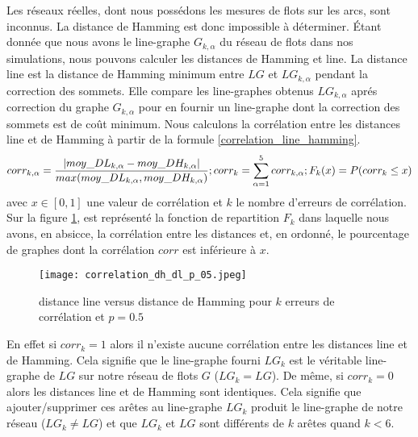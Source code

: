 Les r\'eseaux r\'eelles, dont nous poss\'edons les mesures de flots sur les arcs, sont inconnus.
La distance de Hamming est donc impossible \`a d\'eterminer.
\'Etant donn\'ee que nous avons le line-graphe $G_{k,\alpha}$ du r\'eseau de flots dans nos simulations, nous pouvons calculer les distances de Hamming et line. 
\newline
La distance line est la distance de Hamming minimum entre $LG$ et $LG_{k,\alpha}$ pendant la correction des sommets. 
Elle compare les line-graphes obtenus $LG_{k,\alpha}$ apr\'es correction du graphe $G_{k,\alpha}$ pour en fournir un line-graphe dont la correction des sommets est de co\^ut minimum.
\newline
Nous calculons la corr\'elation entre les distances line et de Hamming \`a partir de la formule \ref{correlation_line_hamming}.
\begin{equation}
	corr_{k,\alpha} =  \frac{ | moy\_DL_{k, \alpha} - moy\_DH_{k, \alpha} | }{ max(moy\_DL_{k, \alpha},  moy\_DH_{k, \alpha}) };
	\\
	corr_{k} = \sum_{\alpha = 1}^{5}corr_{k,\alpha} ;
	\\
	F_k (x) = P(corr_{k} \le x ) 
\label{correlation_line_hamming}
\end{equation}
avec $x \in [0,1]$ une valeur de corr\'elation et $k$ le nombre d'erreurs de corr\'elation. 
\newline
Sur la figure \ref{dh_vs_dl_p_05}, est repr\'esent\'e la fonction de repartition $F_k$ dans laquelle nous avons, en absicce, la corr\'elation entre les distances et, en ordonn\'e, le pourcentage de graphes dont la corr\'elation $corr$ est inf\'erieure \`a $x$. 
\begin{figure}[htb!] 
\centering
\texttt{[image: correlation\_dh\_dl\_p\_05.jpeg]}
\caption{ distance line versus distance de Hamming pour $k$ erreurs de corr\'elation et $p = 0.5$ }
\label{dh_vs_dl_p_05} 
\end{figure}
En effet si $corr_k = 1$ alors il n'existe aucune corr\'elation entre les distances line et de Hamming. Cela signifie que le line-graphe fourni $LG_{k}$ est  le v\'eritable line-graphe de $LG$ sur notre r\'eseau de flots $G$ ($LG_{k} = LG$). 
De m\^eme, si $corr_k = 0$ alors les distances line et de Hamming sont identiques. Cela signifie que ajouter/supprimer ces ar\^etes au line-graphe $LG_k$ produit le line-graphe de notre r\'eseau ($LG_{k} \neq LG$) et que $LG_{k}$ et $LG$ sont diff\'erents de $k$ ar\^etes quand $k < 6$.
